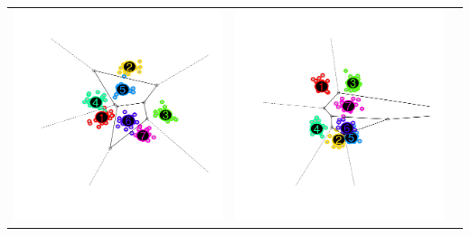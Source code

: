 \documentclass{beamer}
\begin{document}
\begin{frame}
\begin{center}
\begin{tabular}{ccc}
\includegraphics[scale = 0.2, clip = true, trim = 0.6in 0.2in 0.6in 0.2in]{../info_theory_paper/gaussian_figure1b.png} &
\includegraphics[scale = 0.2, clip = true, trim = 0.6in 0.2in 0.6in 0.2in]{../info_theory_paper/gaussian_figure1c.png}
\end{tabular}
\end{center}
\end{frame}
\end{document}
